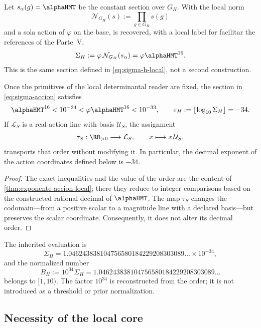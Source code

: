 Let \(s_\alpha(g)=\alphaHMT\) be the constant section over \(G_H\). With the
local norm
\[
\mathcal N_{G_H}(s):=\prod_{g\in G_H}s(g)
\]
and a sola action of \(\varphi\) on the base, is recovered, with a
local label for facilitar the references of the Parte~V,
\begin{equation}
\label{eq:sigma-accion}
\Sigma_H
:=\varphi\,\mathcal N_{G_H}(s_\alpha)
=\varphi\alphaHMT^{16}.
\end{equation}
This is the same section defined in \cref{eq:sigma-h-local}, not a second
construction.

\begin{theorem}
\label{thm:orden-accion}
Once the primitives of the local determinantal reader are fixed, the section in
\cref{eq:sigma-accion} satisfies
\[
\alphaHMT^{16}<10^{-34}
<\varphi\alphaHMT^{16}<10^{-33},
\qquad
\varepsilon_H:=\left\lfloor\log_{10}\Sigma_H\right\rfloor=-34.
\]
If \(\mathcal L_S\) is a real action line with basis
\(\mathcal U_S\), the assignment
\[
\tau_S:\RR_{>0}\longrightarrow\mathcal L_S,
\qquad x\longmapsto x\,\mathcal U_S,
\]
transports that order without modifying it. In particular, the decimal exponent
of the action coordinates defined below is \(-34\).
\end{theorem}

\begin{proof}
The exact inequalities and the value of the order are the content of \cref{thm:exponente-accion-local}; there they reduce to integer comparisons based on the constructed rational decimal of \(\alphaHMT\). The map \(\tau_S\) changes the codomain—from a positive scalar to a magnitude line with a declared basis—but preserves the scalar coordinate. Consequently, it does not alter its decimal order.
\end{proof}

The inherited evaluation is
\[
\Sigma_H
=1.046243838104756580184229208303089\ldots\times10^{-34},
\]
and the normalized number
\[
B_H:=10^{34}\Sigma_H
=1.046243838104756580184229208303089\ldots
\]
belongs to \([1,10)\). The factor \(10^{34}\) is reconstructed from the
order; it is not introduced as a threshold or prior normalization.

\subsection{Necessity of the local core}

